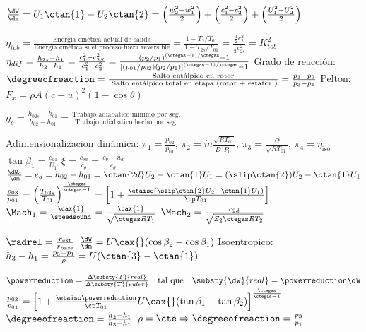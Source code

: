 
\begin{formuleo}
$\frac{\dW}{\dm} = U_1 \ctan{1} - U_2\ctan{2}= \left( \frac{w_2^2-w_1^2}{2} \right)+\left( \frac{c_1^2-c_2^2}{2} \right)+ \left( \frac{U_1^2-U_2^2}{2} \right)$ \separar 

$\eta_{t o b}=\frac{\text {Energía cinética actual de salida}}{\text {Energía cinética si el proceso fuera reversible}} =\frac{1-T_2/T_{01}}{1-T_{2s}/T_{01}}= \frac{\frac{1}{2} c_{2}^{2}}{\frac{1}{2} c_{2 s}^{2}}=K_{t o b}^{2}$ \separar $\eta_{d i f}=\frac{h_{2 s}-h_{1}}{h_{2}-h_{1}}=\frac{c_{1}^{2}-c_{2 S}^{2}}{c_{1}^{2}-c_{2}^{2}}=\frac{(p_2/p_1)^{(\ctegas-1)/\ctegas}-1}{\left[(p_{01}/p_{02})(p_2/p_1) \right]^{(\ctegas-1)/\ctegas}-1}$ \separar Grado de reacción: $\degreeofreaction=\frac{\text { Salto entálpico en rotor }}{\text { Salto entálpico total en etapa (rotor }+\text { estator } )} =\frac{p_{3}-p_{2}}{p_{3}-p_{1}}$ \separar   Pelton: $F_x=\rho A (c-u)^2(1-\cos \theta )$ \separar

$\eta_{c}=\frac{h_{02s}-h_{01}}{h_{02}-h_{01}}= \frac{\text{Trabajo adiabatico mínimo por seg.}}{\text{Trabajo adiabatico hecho por seg.}}$
\end{formuleo}
\vspace{\formuleoseparator}
\begin{formuleo}[Centrifugos] Adimensionalizacion dinámica: $\pi_{1}=\frac{p_{02}}{p_{01}}$, $\pi_{2}=\dot{m} \frac{\sqrt{R T_{01}}}{D^{2} P_{01}}$, $\pi_{3}=\frac{\Omega}{\sqrt{R T_{01}}}$, $\pi_{4}=\eta_{\mathrm{iso}}$\separar$\tan \beta_{1}=\frac{c_{a 1}}{U_{1}}$ \separar $\xi=\frac{c_{\theta d}}{c_{\theta}}=\frac{c_{\theta}-u_{d}}{c_{\theta}}$ \separar $\frac{\dW_d}{\dm}=e_d = h_{02}-h_{01}=\ctan{2d} U_2 - \ctan{1} U_1 = (\slip \ctan{2})U_2 - \ctan{1} U_1$ 
\separar $\frac{p_{03}}{p_{01}}= \left( \frac{T_{03s}}{T_{01}}\right)^{\frac{\ctegas}{\ctegas-1}} =\left[ 1+ \frac{\etaiso (\slip \ctan{2}U_2 - \ctan{1}U_1)}{\cp T_{01}} \right]$ \separar $\Mach_1 = \frac{\cax{1}}{\speedsound} = \frac{\cax{1}}{\sqrt{\ctegas R T_1}}$ \separar $\Mach_2 = \frac{c_{2d}}{\sqrt{Z_2\ctegas R T_2}}$

\end{formuleo}
\vspace{\formuleoseparator}
\begin{formuleo}[Axiales]
$\radrel = \frac{r_{\mathrm{ext}}}{r_{\mathrm{base}}}$ \separar $ \frac{\dW}{\dm} = U \cax{} (\cos\beta_2 - \cos\beta_1 )$ \separar Isoentropico: $h_3 - h_1 = \frac{p_3 -p_1}{\rho}=U (\ctan{3}-\ctan{1})$ \separar

$\powerreduction = \frac{\Delta \substy{T}{real}}{\Delta \substy{T}{euler}} \quad \text{tal que} \quad \substy{\dW}{real} = \powerreduction \dW$ \separar $\frac{p_{03}}{p_{01}} = \left[1 + \frac{\etaiso \powerreduction}{\cp T_{01}}U \cax{} (\tan \beta_1 - \tan \beta_2) \right]^{\frac{\ctegas}{\ctegas-1}}$ \separar $\degreeofreaction = \frac{h_2 - h_1}{h_3 - h_1}$ \going $\rho = \cte \Rightarrow \degreeofreaction = \frac{p_3}{p_1}$ 
\end{formuleo}
